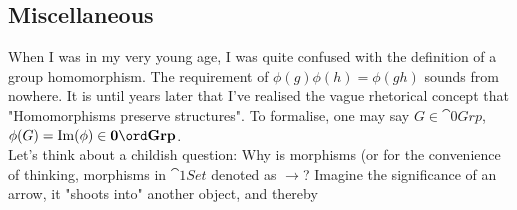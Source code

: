 \subsection{Miscellaneous}

When I was in my very young age, I was quite confused with the definition of a group homomorphism. The requirement of \(\phi(g)\phi(h)=\phi(gh)\) sounds from nowhere. It is until years later that I've realised the vague rhetorical concept that "Homomorphisms preserve structures". To formalise, one may say \(G\in \cat{0}{Grp}\), \(\phi(G)=\oIm (\phi)\in \cat{0}{Grp}\). \\

Let's think about a childish question: Why is morphisms (or for the convenience of thinking, morphisms in \(\cat{1}{Set}\) denoted as \(\to\)? Imagine the significance of an arrow, it "shoots into" another object, and thereby 
